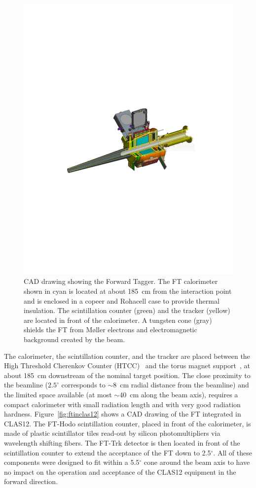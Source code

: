 \begin{figure}[th!]
\centering 
\includegraphics[width=\columnwidth]{./fig/ft-model.pdf} 
\caption{CAD drawing showing the Forward Tagger.
  The FT calorimeter shown in cyan is located at about 185~cm from the interaction point
  and is enclosed in a copeer and Rohacell case to provide thermal insulation. The scintillation counter (green) and the tracker (yellow) are located in front of the calorimeter. A tungsten cone (gray) shields the FT from M{\o}ller electrons
  and electromagnetic background created by the beam. } 
\label{fig:ftcad} 
\end{figure}

The calorimeter, the scintillation counter, and the tracker are placed between the High Threshold Cherenkov
Counter (HTCC)~\cite{htcc} and the torus magnet support~\cite{magnets}, at about 185~cm downstream of the
nominal target position. The close proximity to the beamline ($2.5^\circ$ corresponds to $\sim$8~cm radial distance from the beamline) and the
limited space available (at most $\sim$40~cm along the beam axis), requires a compact calorimeter with small
radiation length and with very good radiation hardness. Figure~\ref{fig:ftinclas12} shows a CAD drawing of the
FT integrated in CLAS12. The FT-Hodo scintillation counter, placed in front of the calorimeter, is made of plastic
scintillator tiles  read-out by silicon photomultipliers via wavelength shifting fibers. The FT-Trk detector is then
located in front of the scintillation counter to extend the acceptance of the FT down to 2.5$^\circ$. All of these
components were designed to fit within a 5.5$^{\circ}$ cone around the beam axis to have no impact on the operation
and acceptance of the CLAS12 equipment in the forward direction.


